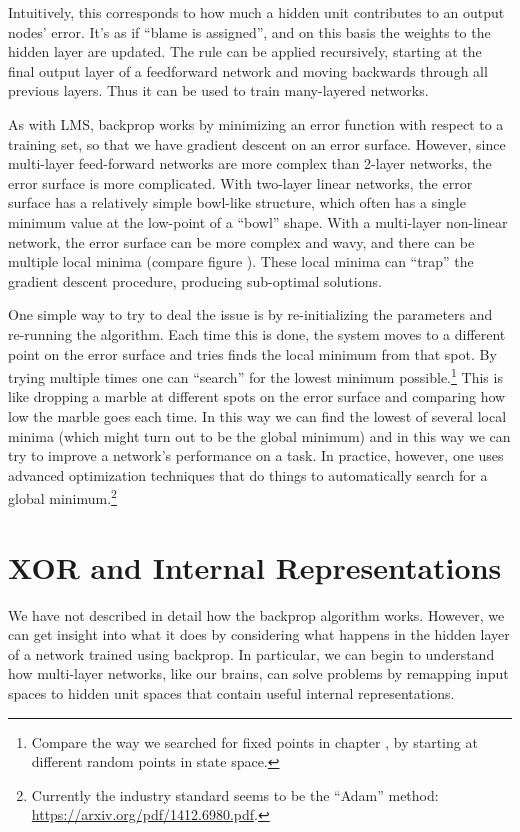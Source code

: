 Intuitively, this corresponds to how much a  hidden unit contributes to an output nodes' error. It's as if ``blame is assigned'', and on this basis the weights to the hidden layer are updated. The rule can be applied recursively, starting at the final output layer of a feedforward network and moving backwards through all previous layers. Thus it can be used to train many-layered networks. 

As with LMS, backprop works by minimizing an error function with respect to a training set, so that we have gradient descent on an error surface. However, since multi-layer feed-forward networks are more complex than 2-layer networks, the error surface is more complicated. With two-layer linear networks, the error surface has a relatively simple bowl-like structure, which often has a single minimum value at the low-point of a ``bowl'' shape. With a multi-layer non-linear network, the error surface can be more complex and wavy, and there can be multiple local minima (compare figure ). These local minima can ``trap'' the gradient descent procedure, producing sub-optimal solutions.

One simple way to try to deal the issue is by re-initializing the parameters and re-running the algorithm. Each time this is done, the system moves to a different point on the error surface and tries finds the local minimum from that spot. By trying multiple times one can ``search'' for the lowest minimum possible.\footnote{Compare the way we searched for fixed points in chapter , by starting at different random points in state space.}  This is like dropping a marble at different spots on the error surface and comparing how low the marble goes each time. In this way we can find the lowest of several local minima (which might turn out to be the global minimum) and in this way we can try to improve a network's performance on a task. In practice, however, one uses advanced optimization techniques that do things to automatically search for a global minimum.\footnote{Currently the industry standard seems to be the ``Adam'' method: \url{https://arxiv.org/pdf/1412.6980.pdf}.}

\section{XOR and Internal Representations}\label{sect_xor_remap}

We have not described in detail how the backprop algorithm works. However, we can get insight into what it does by considering what happens in the hidden layer of a network trained using backprop. In particular, we can begin to understand how multi-layer networks, like our brains, can solve problems by remapping input spaces to hidden unit spaces that contain useful internal representations. 

